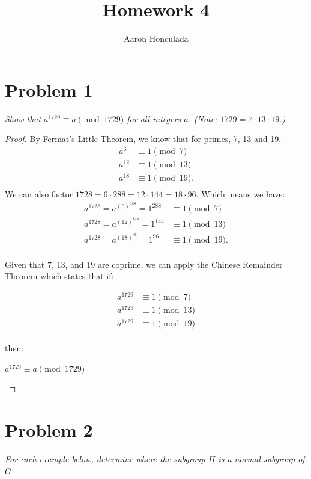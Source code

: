 \documentclass{article}
\title{Homework 4}
\author{Aaron Honculada}
\date{\monthname[\month] \the\year}
\theoremstyle{plain} %
\theoremstyle{definition} %
\begin{document}
\maketitle

\section*{Problem 1}
\noindent\textit{Show that $a^{1729} \equiv a \pmod{1729}$ for all integers $a$. (Note: $1729 = 7 \cdot 13 \cdot 19$.)}

\begin{proof}
    By Fermat's Little Theorem, we know that for primes, 7, 13 and 19,
    \begin{align*}
        a^6 &\equiv 1 \pmod{7} \\
        a^{12} &\equiv 1 \pmod{13} \\
        a^{18} &\equiv 1 \pmod{19}. \\
    \end{align*}
    We can also factor $1728 = 6 \cdot 288 = 12 \cdot 144 = 18 \cdot 96$.
    Which means we have:
    \begin{align*}
        a^{1728} = a^{(6)^{288}} = 1^{288} &\equiv 1 \pmod{7} \\
        a^{1728} = a^{(12)^{144}} = 1^{144} &\equiv 1 \pmod{13} \\
        a^{1728} = a^{(18)^{96}} = 1^{96} &\equiv 1 \pmod{19}. \\
    \end{align*}
    
    Given that 7, 13, and 19 are coprime, we can apply the Chinese Remainder Theorem
    which states that if:

    \begin{align*}
        a^{1729} &\equiv 1 \pmod{7} \\
        a^{1729} &\equiv 1 \pmod{13} \\
        a^{1729} &\equiv 1 \pmod{19} \\
    \end{align*}
    
    then:
    \begin{centering}
        $a^{1729} \equiv a \pmod{1729}$
    \end{centering}


\end{proof}

\section*{Problem 2}
\noindent\textit{For each example below, determine where the subgroup $H$ is a normal
subgroup of $G$.}
\end{document}
